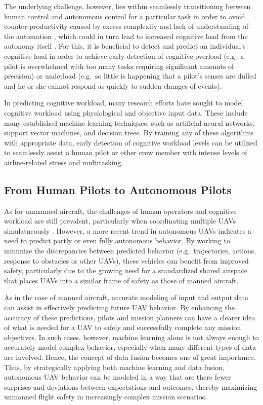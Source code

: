\documentclass[12pt]{uthesis-v12}  %
\begin{document}
The underlying challenge, however, lies within seamlessly transitioning between human control and autonomous control for a particular task in order to avoid counter-productivity caused by excess complexity and lack of understanding of the automation \cite{rudisill}, which could in turn lead to increased cognitive load from the autonomy itself \cite{funk}. For this, it is beneficial to detect and predict an individual's cognitive load in order to achieve early detection of cognitive overload (e.g.~a pilot is overwhelmed with too many tasks requiring significant amounts of precision) or underload (e.g.~so little is happening that a pilot's senses are dulled and he or she cannot respond as quickly to sudden changes of events). 

In predicting cognitive workload, many research efforts have sought to model cognitive workload using physiological and objective input data. These include many established machine learning techniques, such as artificial neural networks, support vector machines, and decision trees. By training any of these algorithms with appropriate data, early detection of cognitive workload levels can be utilized to seamlessly assist a human pilot or other crew member with intense levels of airline-related stress and multitasking.

\subsection{From Human Pilots to Autonomous Pilots}

As for unmanned aircraft, the challenges of human operators and cognitive workload are still prevalent, particularly when coordinating multiple UAVs simulatneously \cite{halverson}. However, a more recent trend in autonomous UAVs indicates a need to predict partly \cite{williams} or even fully \cite{albaker} autonomous behavior. By working to minimize the discrepancies between predicted behavior (e.g.~trajectories, actions, response to obstacles or other UAVs), these vehicles can benefit from improved safety, particularly due to the growing need for a standardized shared airspace \cite{nasem, albaker, hobbs, mccarley} that places UAVs into a similar frame of safety as those of manned aircraft. 

As in the case of manned aircraft, accurate modeling of input and output data can assist in effectively predicting future UAV behavior. By enhancing the accuracy of these predictions, pilots and mission planners can have a clearer idea of what is needed for a UAV to safely and successfully complete any mission objectives. In such cases, however, machine learning alone is not always enough to accurately model complex behavior, especially when many different types of data are involved. Hence, the concept of data fusion becomes one of great importance. Thus, by strategically applying both machine learning and data fusion, autonomous UAV behavior can be modeled in a way that are there fewer surprises and deviations between expectations and outcomes, thereby maximizing unmanned flight safety in increasingly complex mission scenarios.
\end{document}
